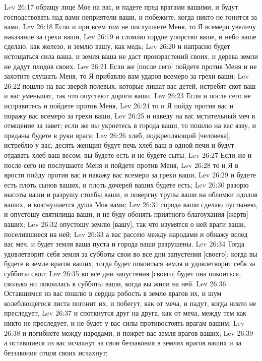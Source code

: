 Lev 26:17  обращу лице Мое на вас, и падете пред врагами вашими, и будут господствовать над вами неприятели ваши, и побежите, когда никто не гонится за вами.
Lev 26:18  Если и при всем том не послушаете Меня, то Я всемеро увеличу наказание за грехи ваши,
Lev 26:19  и сломлю гордое упорство ваше, и небо ваше сделаю, как железо, и землю вашу, как медь;
Lev 26:20  и напрасно будет истощаться сила ваша, и земля ваша не даст произрастений своих, и дерева земли не дадут плодов своих.
Lev 26:21  Если же [после сего] пойдете против Меня и не захотите слушать Меня, то Я прибавлю вам ударов всемеро за грехи ваши:
Lev 26:22  пошлю на вас зверей полевых, которые лишат вас детей, истребят скот ваш и вас уменьшат, так что опустеют дороги ваши.
Lev 26:23  Если и после сего не исправитесь и пойдете против Меня,
Lev 26:24  то и Я пойду против вас и поражу вас всемеро за грехи ваши,
Lev 26:25  и наведу на вас мстительный меч в отмщение за завет; если же вы укроетесь в города ваши, то пошлю на вас язву, и преданы будете в руки врага;
Lev 26:26  хлеб, подкрепляющий [человека], истреблю у вас; десять женщин будут печь хлеб ваш в одной печи и будут отдавать хлеб ваш весом; вы будете есть и не будете сыты.
Lev 26:27  Если же и после сего не послушаете Меня и пойдете против Меня,
Lev 26:28  то и Я в ярости пойду против вас и накажу вас всемеро за грехи ваши,
Lev 26:29  и будете есть плоть сынов ваших, и плоть дочерей ваших будете есть;
Lev 26:30  разорю высоты ваши и разрушу столбы ваши, и повергну трупы ваши на обломки идолов ваших, и возгнушается душа Моя вами;
Lev 26:31  города ваши сделаю пустынею, и опустошу святилища ваши, и не буду обонять приятного благоухания [жертв] ваших;
Lev 26:32  опустошу землю [вашу], так что изумятся о ней враги ваши, поселившиеся на ней;
Lev 26:33  а вас рассею между народами и обнажу вслед вас меч, и будет земля ваша пуста и города ваши разрушены.
Lev 26:34  Тогда удовлетворит себя земля за субботы свои во все дни запустения [своего]; когда вы будете в земле врагов ваших, тогда будет покоиться земля и удовлетворит себя за субботы свои;
Lev 26:35  во все дни запустения [своего] будет она покоиться, сколько ни покоилась в субботы ваши, когда вы жили на ней.
Lev 26:36  Оставшимся из вас пошлю в сердца робость в земле врагов их, и шум колеблющегося листа погонит их, и побегут, как от меча, и падут, когда никто не преследует,
Lev 26:37  и споткнутся друг на друга, как от меча, между тем как никто не преследует, и не будет у вас силы противостоять врагам вашим;
Lev 26:38  и погибнете между народами, и пожрет вас земля врагов ваших;
Lev 26:39  а оставшиеся из вас исчахнут за свои беззакония в землях врагов ваших и за беззакония отцов своих исчахнут;

